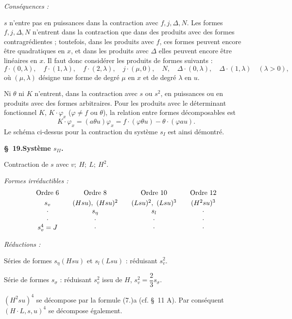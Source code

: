 \documentclass[11pt]{article}
\begin{document}
\noindent\emph{Conséquences :}

$s$ n'entre pas en puissances dans la contraction avec $f,j,\Delta,N$. Les formes $f,j,\Delta,N$ n'entrent dans la contraction que dans des produits avec des formes contragrédientes ; toutefois, dans les produits avec $f$, ces formes peuvent encore être quadratiques en $x$, et dans les produits avec $\Delta$ elles peuvent encore être linéaires en $x$. Il faut donc considérer les produits de formes suivants :
\[
 f\cdot(0,\lambda),\quad f\cdot(1,\lambda),\quad f\cdot(2,\lambda),\quad
 j\cdot(\mu,0),\quad N,\quad
 \Delta\cdot(0,\lambda),\quad \Delta\cdot(1,\lambda)\quad(\lambda>0),
\]
où $(\mu,\lambda)$ désigne une forme de degré $\mu$ en $x$ et de degré $\lambda$ en $u$.

Ni $\theta$ ni $K$ n'entrent, dans la contraction avec $s$ ou $s^2$, en puissances ou en produits avec des formes arbitraires. Pour les produits avec le déterminant fonctionnel $K$, $K\cdot\varphi_x$ ($\varphi\ne f$ ou $\theta$), la relation entre formes décomposables est
\[
K\cdot\varphi_x=(a\theta u)\varphi_x=f\cdot(\varphi\theta u)-\theta\cdot(\varphi a u).
\]
Le schéma ci-dessus pour la contraction du système $s_I$ est ainsi démontré.

\begin{center}
\textbf{\S\ 19.\quad Système $s_{II}$.}
\end{center}

Contraction de $s$ avec $v;\ H;\ L;\ H^2$.

\noindent\emph{Formes irréductibles :}
\[
\begin{array}{c@{\qquad}c@{\qquad}c@{\qquad}c}
\text{Ordre 6} & \text{Ordre 8} & \text{Ordre 10} & \text{Ordre 12}\\[0.3em]
s_v & (Hsu),\ (Hsu)^2 & (Lsu)^2,\ (Lsu)^3 & (H^2su)^3\\
\cdot & s_\eta & s_l & \cdot\\
\cdot & \cdot & \cdot & \cdot\\
s_v^4=J & \cdot & \cdot & \cdot
\end{array}
\]

\noindent\emph{Réductions :}

Séries de formes $s_\eta(Hsu)$ et $s_l(Lsu)$ : réduisant $s_v^2$.

Série de formes $s_\sigma$ : réduisant $s_v^2$ issu de $H$, $s_v^2=\dfrac23s_\sigma$.

$(H^2su)^4$ se décompose par la formule (7.)a (cf. \S\ 11 A). Par conséquent $(H\cdot L,s,u)^4$ se décompose également.
\end{document}
